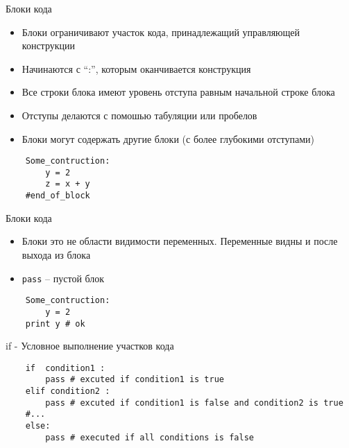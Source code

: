 \documentclass{article}
\begin{document}
\LARGE

\begin{center} Блоки кода \end{center}
\begin{itemize}
	\item Блоки ограничивают участок кода, принадлежащий управляющей конструкции
	\item Начинаются с “:”, которым оканчивается конструкция 
	\item Все строки блока имеют уровень отступа равным начальной строке блока
	\item Отступы делаются с помошью табуляции или пробелов
	\item Блоки могут содержать другие блоки (с более глубокими отступами)
\end{itemize}
\vspace{15pt}
\begin{lstlisting}
	Some_contruction:
		y = 2
		z = x + y
	#end_of_block
\end{lstlisting}
\newpage

\begin{center} Блоки кода \end{center}
\begin{itemize}
	\item Блоки это не области видимости переменных. Переменные видны и после выхода из блока
	\item \lstinline$pass$ – пустой блок
\end{itemize}
\vspace{15pt}
\begin{lstlisting}
	Some_contruction:
		y = 2
	print y # ok		
\end{lstlisting}
\newpage

\begin{center} if - Условное выполнение участков кода \end{center}
\vspace{15pt}
\begin{lstlisting}
	if  condition1 :
	    pass # excuted if condition1 is true
	elif condition2 :
	    pass # excuted if condition1 is false and condition2 is true
	#... 
	else:
	    pass # executed if all conditions is false 
\end{lstlisting}
\newpage
\end{document}
